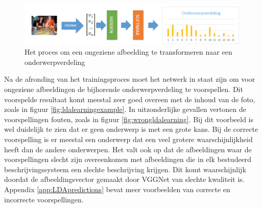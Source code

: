 \begin{figure}[tb]
    \centering
    \includegraphics[width=\linewidth]{Images/LDANetwerk.PNG}
    \caption{Het proces om een ongeziene afbeelding te transformeren naar een onderwerpverdeling}
    \label{fig:learningLDA}
\end{figure}

Na de afronding van het trainingsproces moet het netwerk in staat zijn om voor ongeziene afbeeldingen de bijhorende onderwerpverdeling te voorspellen. Dit voorspelde resultaat komt meestal zeer goed overeen met de inhoud van de foto, zoals in figuur \ref{fig:ldalearningexample}. In uitzonderlijke gevallen vertonen de voorspellingen fouten, zoals in figuur \ref{fig:wrongldalearning}. Bij dit voorbeeld is wel duidelijk te zien dat er geen onderwerp is met een grote kans. Bij de correcte voorspelling is er meestal een onderwerp dat een veel grotere waarschijnlijkheid heeft dan de andere onderwerpen. Het valt ook op dat de afbeeldingen waar de voorspellingen slecht zijn overeenkomen met afbeeldingen die in elk bestudeerd beschrijvingssysteem een slechte beschrijving krijgen. Dit komt waarschijnlijk doordat de afbeeldingsvector gemaakt door VGGNet van slechte kwaliteit is. Appendix \ref{app:LDApredictions} bevat meer voorbeelden van correcte en incorrecte voorspellingen.

